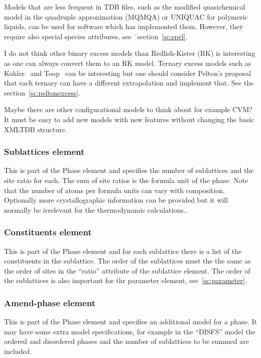 \documentclass[12pt]{article}
\begin{document}
\begin{appendices}
Models that are less frequent in TDB files, such as the modified
quasichemical model in the quadruple approximation (MQMQA) or UNIQUAC
for polymeric liquids, can be used for software which has implemented
them. However, they require also special species attribures, see
¨section~\ref{sc:spel}.

I do not think other binary excess models than Redlish-Kister (RK) is
interesting as one can always convert them to an RK model.  Ternary
excess models such as Kohler~\cite{60Koh} and Toop~\cite{65Toop} can
be interesting but one should consider Pelton's proposal that each
ternary can have a different extrapolation and implement that.  See
the section~\ref{sc:peltonexcess}.

Maybe there are other configurational models to think about for
example CVM?  It must be easy to add new models with new features
without changing the basic XMLTDB structure.

\subsubsection{Sublattices element}

This is part of the Phase element and specifies the number of
sublattices and the site ratio for each.  The sum of site ratios is
the formula unit of the phase.  Note that the number of atoms per
formula units can vary with composition.  Optionally more
crystallographic information can be provided but it will normally be
irrelevant for the thermodynamic calculations..

\subsubsection{Constituents element}

This is part of the Phase element and for each sublattice there is a
list of the constituents in the sublattice.  The order of the
sublattices must the the same as the order of sites in the ``ratio''
attribute of the sublattice element.  The order of the sublattices is
also important for thr parameter element, see~\ref{sc:parameter}.

\subsubsection{Amend-phase element}

This is part of the Phase element and specifies an additional model
for a phase.  It may have some extra model specifications, for example
in the ``DISFS'' model the ordered and disordered phases and the
number of sublattices to be summed are included.


\end{appendices}
\end{document}
